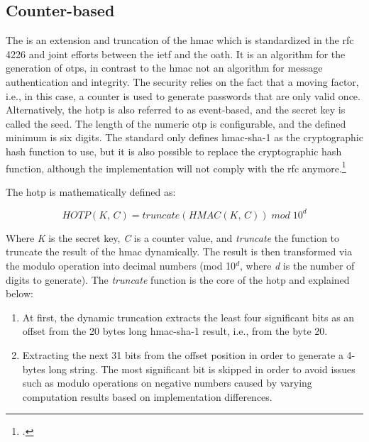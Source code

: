 \subsection{Counter-based}
\label{subsec:hotp}

The  is an extension and truncation of the \gls{hmac} which is standardized in the \gls{rfc} 4226 and joint efforts between the \gls{ietf} and the \gls{oath}. It is an algorithm for the generation of \glspl{otp}, in contrast to the \gls{hmac} not an algorithm for message authentication and integrity. The security relies on the fact that a \frqq moving factor\flqq{}, i.e., in this case, a counter is used to generate passwords that are only valid once. Alternatively, the \gls{hotp} is also referred to as event-based, and the secret key is called the seed. The length of the numeric \gls{otp} is configurable, and the defined minimum is six digits. The standard only defines \gls{hmac}-\gls{sha}-1 as the cryptographic hash function to use, but it is also possible to replace the cryptographic hash function, although the implementation will not comply with the \gls{rfc} anymore.\footcites[See][]{m2005rfc}[See][Chapter 3]{9781849287333}

The \gls{hotp} is mathematically defined as:

\begin{equation*}
	HOTP(K,\, C) = truncate(HMAC(K,\, C))\; mod \; 10^d
\end{equation*}

Where \textit{K} is the secret key, \textit{C} is a counter value, and \textit{truncate} the function to truncate the result of the \gls{hmac} dynamically. The result is then transformed via the modulo operation into decimal numbers 	(mod 10$^d$, where \textit{d} is the number of digits to generate). The \textit{truncate} function is the core of the \gls{hotp} and explained below:

\begin{enumerate}
	\item At first, the dynamic truncation extracts the least four significant bits as an offset from the 20 bytes long \gls{hmac}-\gls{sha}-1 result, i.e., from the byte 20.
	\item Extracting the next 31 bits from the offset position in order to generate a 4-bytes long string. The most significant bit is skipped in order to avoid issues such as modulo operations on negative numbers caused by varying computation results based on implementation differences.
\end{enumerate}

